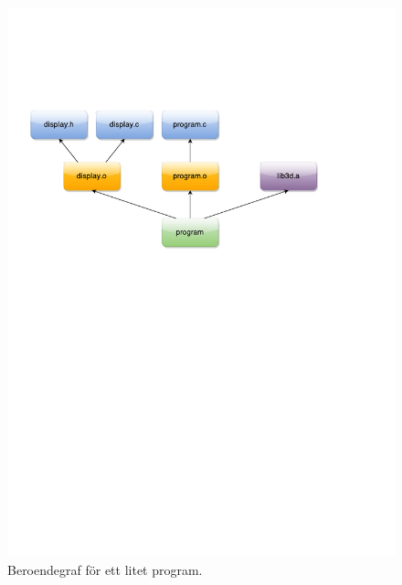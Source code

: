 \begin{figure}[h!]
  \centering
  \includegraphics[trim=0 350 0 120, clip]{yngve-tex/grafik/beroendegraf.pdf}
  \caption{Beroendegraf för ett litet program.}
  \label{fig:beroendegraf}
\end{figure}

